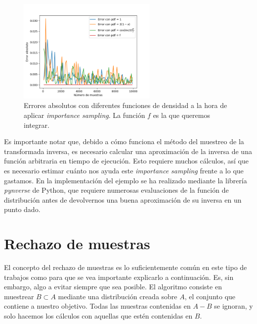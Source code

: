 \documentclass{scrbook}
\begin{document}
\begin{figure}[ht]
	\centering
	\includegraphics[width=0.6\textwidth]{importancesampling}
	\caption{Errores absolutos con diferentes funciones de densidad a la hora de aplicar \textit{importance sampling}. La función $f$ es la que queremos integrar. }
	\label{fig:importance}
\end{figure}

Es importante notar que, debido a cómo funciona el método del muestreo de la transformada inversa, es necesario calcular una aproximación de la inversa de una función arbitraria en tiempo de ejecución. Esto requiere muchos cálculos, así que es necesario estimar cuánto nos ayuda este \textit{importance sampling} frente a lo que gastamos. En la implementación del ejemplo se ha realizado mediante la librería \textit{pynverse} de Python, que requiere numerosas evaluaciones de la función de distribución antes de devolvernos una buena aproximación de su inversa en un punto dado.

\section{Rechazo de muestras}
\label{rechazo}
El concepto del rechazo de muestras es lo suficientemente común en este tipo de trabajos como para que se vea importante explicarlo a continuación. Es, sin embargo, algo a evitar siempre que sea posible. El algoritmo consiste en muestrear $B \subset A$ mediante una distribución creada sobre $A$, el conjunto que contiene a nuestro objetivo. Todas las muestras contenidas en $A-B$ se ignoran, y solo hacemos los cálculos con aquellas que estén contenidas en $B$.
\end{document}
